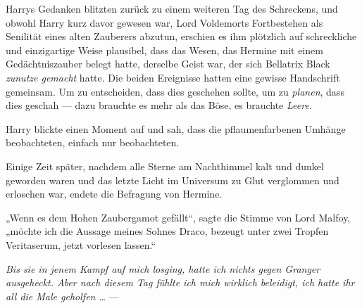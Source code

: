 Harrys Gedanken blitzten zurück zu einem weiteren Tag des Schreckens, und obwohl Harry kurz davor gewesen war, Lord Voldemorts Fortbestehen als Senilität eines alten Zauberers abzutun, erschien es ihm plötzlich auf schreckliche und einzigartige Weise plausibel, dass das Wesen, das Hermine mit einem Gedächtniszauber belegt hatte, derselbe Geist war, der sich Bellatrix Black \emph{zunutze gemacht} hatte. Die beiden Ereignisse hatten eine gewisse Handschrift gemeinsam. Um zu entscheiden, dass dies geschehen sollte, um zu \emph{planen}, dass dies geschah — dazu brauchte es mehr als das Böse, es brauchte \emph{Leere}.

Harry blickte einen Moment auf und sah, dass die pflaumenfarbenen Umhänge beobachteten, einfach nur beobachteten.

Einige Zeit später, nachdem alle Sterne am Nachthimmel kalt und dunkel geworden waren und das letzte Licht im Universum zu Glut verglommen und erloschen war, endete die Befragung von Hermine.

„Wenn es dem Hohen Zaubergamot gefällt“, sagte die Stimme von Lord Malfoy, „möchte ich die Aussage meines Sohnes Draco, bezeugt unter zwei Tropfen Veritaserum, jetzt vorlesen lassen.“

\emph{Bis sie in jenem Kampf auf mich losging, hatte ich nichts gegen Granger ausgeheckt. Aber nach diesem Tag fühlte ich mich wirklich beleidigt, ich hatte ihr all die Male geholfen …} —

